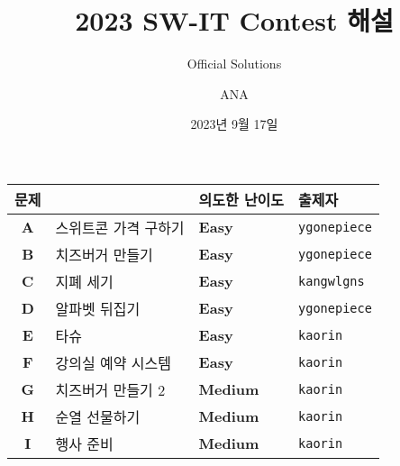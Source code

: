 
\usetikzlibrary{arrows.meta,matrix,decorations.pathreplacing}

\title{2023 SW-IT Contest 해설}
\subtitle{Official Solutions}
\author{ANA}
\date{2023년 9월 17일}


    \setcounter{framenumber}{-1}
    \frame{\titlepage}
        
    \begin{frame} %
        \begin{center}
            \begin{tabular}{cl|l|l}
                \hline
                문제 & & 의도한 난이도 & 출제자 \\
                \hline
                \hline
                \textbf{A} & 스위트콘 가격 구하기& \textbf{\color{acbronze}Easy} & \texttt{ygonepiece} \\
                \textbf{B} & 치즈버거 만들기 & \textbf{\color{acbronze}Easy} & \texttt{ygonepiece} \\
                \textbf{C} & 지폐 세기 & \textbf{\color{acbronze}Easy} & \texttt{kangwlgns} \\
                \textbf{D} & 알파벳 뒤집기 & \textbf{\color{acbronze}Easy} & \texttt{ygonepiece} \\
                \textbf{E} & 타슈 & \textbf{\color{acbronze}Easy} & \texttt{kaorin} \\
                \textbf{F} & 강의실 예약 시스템 & \textbf{\color{acsilver}Easy} & \texttt{kaorin} \\
                \textbf{G} & 치즈버거 만들기 2 & \textbf{\color{acsilver}Medium} & \texttt{kaorin} \\
                \textbf{H} & 순열 선물하기 & \textbf{\color{acsilver}Medium} & \texttt{kaorin} \\
                \textbf{I} & 행사 준비 & \textbf{\color{acgold}Medium} & \texttt{kaorin} \\
                \hline
            \end{tabular}
        \end{center}
    \end{frame}

